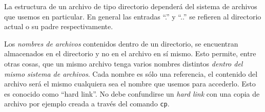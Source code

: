 \documentclass[12pt]{article}
\begin{document}
La estructura de un archivo de tipo directorio dependerá del sistema de 
archivos que usemos en particular. En general las entradas ``.'' y ``..''
se refieren al directorio actual o su padre respectivamente.  



Los \textit{nombres de archivos} contenidos dentro de un directorio, se encuentran 
almacenados en el directorio y no en el archivo en sí mismo. Esto permite, entre otras
cosas, que un mismo archivo tenga varios nombres distintos \textit{dentro del mismo 
sistema de archivos}. Cada nombre es sólo una referencia, el contenido del archivo 
será el mismo cualquiera sea el nombre que usemos para accederlo. Esto es conocido
como ``hard link''. No debe confundirse un \textit{hard link} con una copia de archivo
por ejemplo creada a través del comando \texttt{cp}. 
\end{document}
